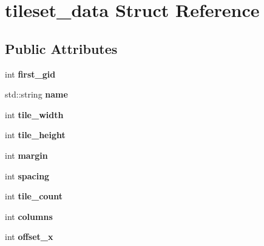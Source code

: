 \hypertarget{structtileset__data}{}\section{tileset\+\_\+data Struct Reference}
\label{structtileset__data}
\subsection*{Public Attributes}
\begin{DoxyCompactItemize}
\item 
\mbox{\label{structtileset__data_a98cf40ccf551f55aa01964b1f69cfe00}} 
int {\bfseries first\+\_\+gid}
\item 
\mbox{\label{structtileset__data_a737121fd5b8b54428456248feeaff3ad}} 
std\+::string {\bfseries name}
\item 
\mbox{\label{structtileset__data_af37ddbd16d813a1aeebc99a5593c6f52}} 
int {\bfseries tile\+\_\+width}
\item 
\mbox{\label{structtileset__data_a0b7a5151bbcdba42bffd3d486a8c3162}} 
int {\bfseries tile\+\_\+height}
\item 
\mbox{\label{structtileset__data_a4ae5593f79ec7b4f83eef2cae74cb5e9}} 
int {\bfseries margin}
\item 
\mbox{\label{structtileset__data_a89d1dd2375e684b13344ad9dbd2f85e2}} 
int {\bfseries spacing}
\item 
\mbox{\label{structtileset__data_ae53ab36b8af1f4156eaae6016da439b1}} 
int {\bfseries tile\+\_\+count}
\item 
\mbox{\label{structtileset__data_a8f94336f8adc74f33ff6a54c41c0037a}} 
int {\bfseries columns}
\item 
\mbox{\label{structtileset__data_aff7245805a7db9daf7c1a7a47f77ec14}} 
int {\bfseries offset\+\_\+x}
\item 
\mbox{\label{structtileset__data_a0757085ab1322c9ed343aabacbc7852b}} 

\end{DoxyCompactItemize}
